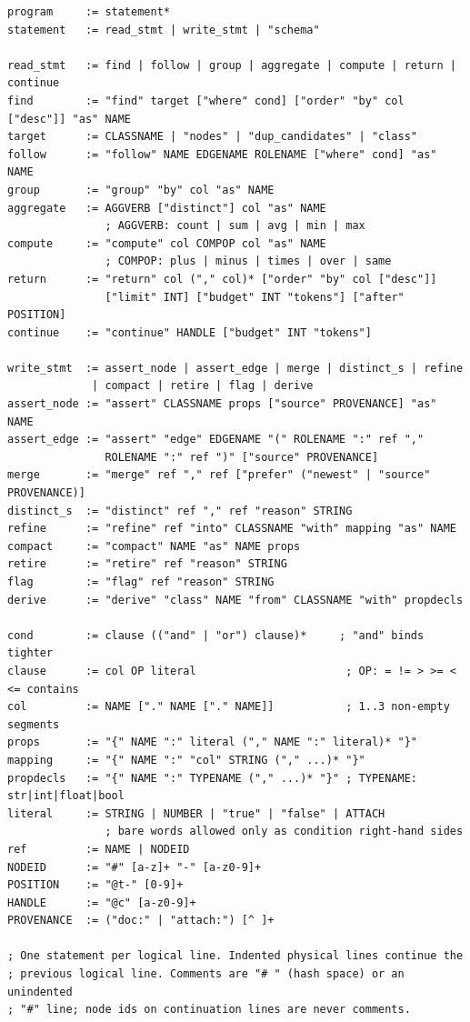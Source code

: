 \documentclass[11pt]{article}
\begin{document}
\begin{lstlisting}[style=plain]
program     := statement*
statement   := read_stmt | write_stmt | "schema"

read_stmt   := find | follow | group | aggregate | compute | return | continue
find        := "find" target ["where" cond] ["order" "by" col ["desc"]] "as" NAME
target      := CLASSNAME | "nodes" | "dup_candidates" | "class"
follow      := "follow" NAME EDGENAME ROLENAME ["where" cond] "as" NAME
group       := "group" "by" col "as" NAME
aggregate   := AGGVERB ["distinct"] col "as" NAME
               ; AGGVERB: count | sum | avg | min | max
compute     := "compute" col COMPOP col "as" NAME
               ; COMPOP: plus | minus | times | over | same
return      := "return" col ("," col)* ["order" "by" col ["desc"]]
               ["limit" INT] ["budget" INT "tokens"] ["after" POSITION]
continue    := "continue" HANDLE ["budget" INT "tokens"]

write_stmt  := assert_node | assert_edge | merge | distinct_s | refine
             | compact | retire | flag | derive
assert_node := "assert" CLASSNAME props ["source" PROVENANCE] "as" NAME
assert_edge := "assert" "edge" EDGENAME "(" ROLENAME ":" ref ","
               ROLENAME ":" ref ")" ["source" PROVENANCE]
merge       := "merge" ref "," ref ["prefer" ("newest" | "source" PROVENANCE)]
distinct_s  := "distinct" ref "," ref "reason" STRING
refine      := "refine" ref "into" CLASSNAME "with" mapping "as" NAME
compact     := "compact" NAME "as" NAME props
retire      := "retire" ref "reason" STRING
flag        := "flag" ref "reason" STRING
derive      := "derive" "class" NAME "from" CLASSNAME "with" propdecls

cond        := clause (("and" | "or") clause)*     ; "and" binds tighter
clause      := col OP literal                       ; OP: = != > >= < <= contains
col         := NAME ["." NAME ["." NAME]]           ; 1..3 non-empty segments
props       := "{" NAME ":" literal ("," NAME ":" literal)* "}"
mapping     := "{" NAME ":" "col" STRING ("," ...)* "}"
propdecls   := "{" NAME ":" TYPENAME ("," ...)* "}" ; TYPENAME: str|int|float|bool
literal     := STRING | NUMBER | "true" | "false" | ATTACH
               ; bare words allowed only as condition right-hand sides
ref         := NAME | NODEID
NODEID      := "#" [a-z]+ "-" [a-z0-9]+
POSITION    := "@t-" [0-9]+
HANDLE      := "@c" [a-z0-9]+
PROVENANCE  := ("doc:" | "attach:") [^ ]+

; One statement per logical line. Indented physical lines continue the
; previous logical line. Comments are "# " (hash space) or an unindented
; "#" line; node ids on continuation lines are never comments.
\end{lstlisting}
\end{document}
